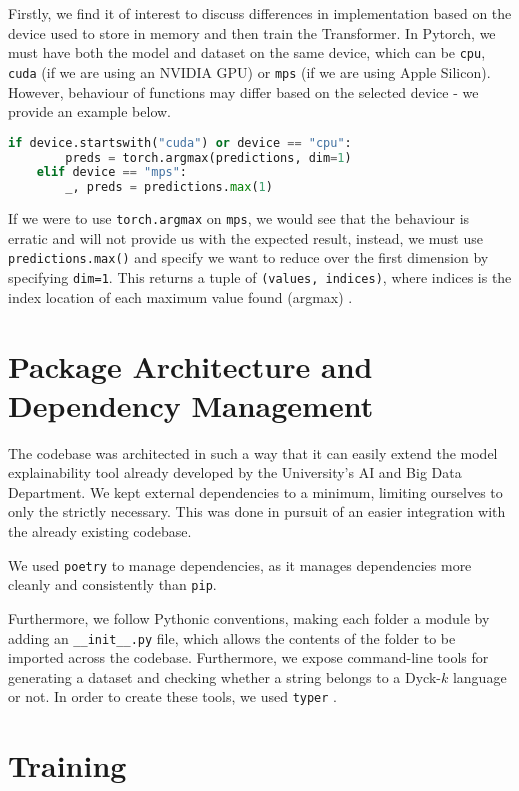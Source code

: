 Firstly, we find it of interest to discuss differences in implementation based on the device used to store in memory and then train the Transformer. In Pytorch, we must have both the model and dataset on the same device, which can be \verb|cpu|, \verb|cuda| (if we are using an NVIDIA GPU) or \verb|mps| (if we are using Apple Silicon). However, behaviour of functions may differ based on the selected device - we provide an example below.

\begin{lstlisting}[language=Python]
    if device.startswith("cuda") or device == "cpu":
        preds = torch.argmax(predictions, dim=1)
    elif device == "mps":
        _, preds = predictions.max(1)
\end{lstlisting}

If we were to use \verb|torch.argmax| on \verb|mps|, we would see that the behaviour is erratic and will not provide us with the expected result, instead, we must use \verb|predictions.max()| and specify we want to reduce over the first dimension by specifying \verb|dim=1|. This returns a tuple of \verb|(values, indices)|, where indices is the index location of each maximum value found (argmax) \cite{pytorch-max}.

\section{Package Architecture and Dependency Management}

The codebase was architected in such a way that it can easily extend the model explainability tool already developed by the University's AI and Big Data Department. We kept external dependencies to a minimum, limiting ourselves to only the strictly necessary. This was done in pursuit of an easier integration with the already existing codebase.

We used \verb|poetry| \cite{poetry} to manage dependencies, as it manages dependencies more cleanly and consistently than \verb|pip|.

Furthermore, we follow Pythonic conventions, making each folder a module by adding an \verb|__init__.py| file, which allows the contents of the folder to be imported across the codebase. Furthermore, we expose command-line tools for generating a dataset and checking whether a string belongs to a Dyck-$k$ language or not. In order to create these tools, we used \verb|typer| \cite{typer}.

\section{Training}

